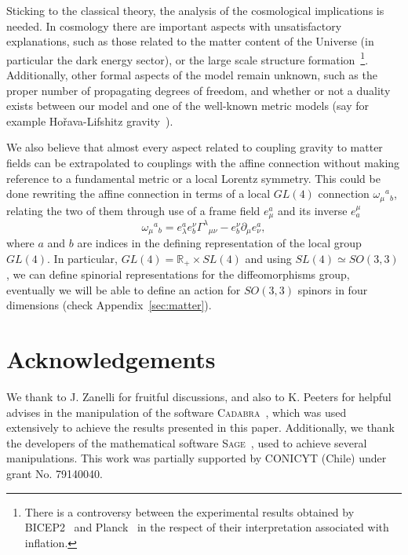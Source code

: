 \documentclass{ws-mpla}
\renewcommand{\(}{\left(}
\renewcommand{\)}{\right)}
\renewcommand{\[}{\left[}
\renewcommand{\]}{\right]}
\begin{document}
Sticking to the classical theory, the analysis of the cosmological implications is needed. In cosmology there are important aspects with unsatisfactory explanations, such as those related to the matter content of the Universe (in particular the dark energy sector), or the large scale structure formation~\footnote{There is a controversy between the experimental results obtained by BICEP2~\cite{Ade:2014xna} and Planck~\cite{Adam:2014bub} in the respect of their interpretation associated with inflation.}. Additionally, other formal aspects of the model remain unknown, such as the proper number of propagating degrees of freedom, and whether or not a duality exists between our model and one of the well-known metric models (say for example Ho\v{r}ava-Lifshitz gravity~\cite{Horava:2009uw,Sotiriou:2010wn}).

We also believe that almost every aspect related to coupling gravity to matter fields can be extrapolated to couplings with the affine connection without making reference to a fundamental metric or a local Lorentz symmetry. This could be  done rewriting the affine connection in terms of a local $GL(4)$ connection
$\omega_{\mu}{}^a{}_b$, relating the two of them through use of a frame field $e_\mu^a$ and its inverse $e^\mu_a$
\begin{equation}
  \omega_{\mu}{}^a{}_b = e_\lambda^a e_b^\nu \Gamma^{\lambda}{}_{\mu\nu} -  e_b^\nu\partial_{\mu}e_\nu^a,
\end{equation} where $a$ and $b$ are indices in the defining representation of the local group $GL(4)$.
 In particular, \mbox{$GL(4) = \mathbb{R}_+ \times SL(4)$} and using \mbox{$SL(4) \simeq SO(3,3)$,} we can define spinorial representations for the diffeomorphisms group, eventually we will be able to define an action for $SO(3,3)$ spinors in four dimensions (check Appendix~\ref{sec:matter}).


\section*{Acknowledgements}
  We thank to J. Zanelli for fruitful discussions, and also to K. Peeters for helpful advises in the manipulation of the software \textsc{Cadabra}~\cite{Peeters:2007wn,peeters2007symbolic,Peeters2007550}, which was used extensively to achieve the results presented in this paper. Additionally, we thank the developers of the mathematical software \textsc{Sage}~\cite{sage}, used to achieve several manipulations. This work was partially supported by CONICYT (Chile) under grant No. 79140040.
\end{document}
